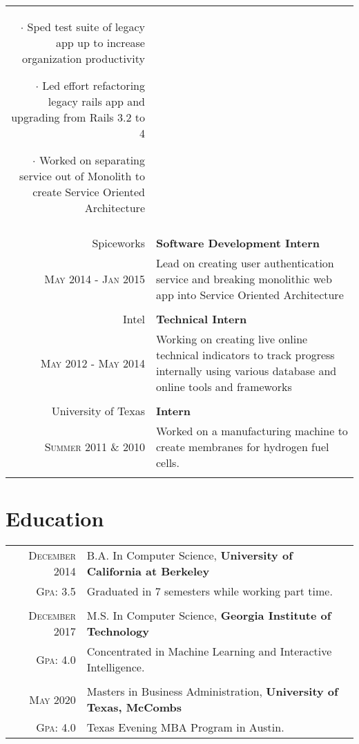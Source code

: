 \documentclass[a4paper,10pt]{article}
\begin{document}
\begin{tabular}{r|p{11cm}}
{		 $\cdot$ Sped test suite of legacy app up to increase organization productivity

		 $\cdot$
		 Led effort refactoring legacy rails app and upgrading from Rails 3.2 to 4

		 $\cdot$
		 Worked on separating service out of Monolith to create Service Oriented Architecture

	 }
	 \\\multicolumn{2}{c}{} \\

 Spiceworks & \textbf{Software Development Intern} \\
 \textsc{May 2014 - Jan 2015} &
	\footnotesize{
		Lead on creating user authentication service and breaking monolithic web app
		into Service Oriented Architecture
	}
	\\\multicolumn{2}{c}{} \\

Intel & \textbf{Technical Intern} \\
\textsc{May 2012 - May 2014} &
 \footnotesize{
	 Working on creating live online technical indicators to track progress
	 internally using various database and online tools and frameworks
 }
 \\\multicolumn{2}{c}{} \\

University of Texas & \textbf{Intern} \\
\textsc{Summer 2011 \& 2010} &
\footnotesize{
	Worked on a manufacturing machine to create membranes for hydrogen fuel cells.
}
\\\multicolumn{2}{c}{} \\

\end{tabular}

\section{Education}
\begin{tabular}{rp{11cm}}
 \textsc{December} 2014 & B.A. In Computer Science, \textbf{University of California at Berkeley}\\
 \textsc{Gpa}: 3.5 &
 \footnotesize{
	 Graduated in 7 semesters while working part time.
}
	 \\\multicolumn{2}{c}{} \\

	\textsc{December} 2017 & M.S. In Computer Science, \textbf{Georgia Institute of Technology}\\
	\textsc{Gpa}: 4.0 &
	\footnotesize{
Concentrated in Machine Learning and Interactive Intelligence.
 }
		\\\multicolumn{2}{c}{} \\

	\textsc{May} 2020 & Masters in Business Administration, \textbf{University of Texas, McCombs}\\
	\textsc{Gpa}: 4.0 &
	\footnotesize{
    Texas Evening MBA Program in Austin.
 }

\end{tabular}


\end{document}
